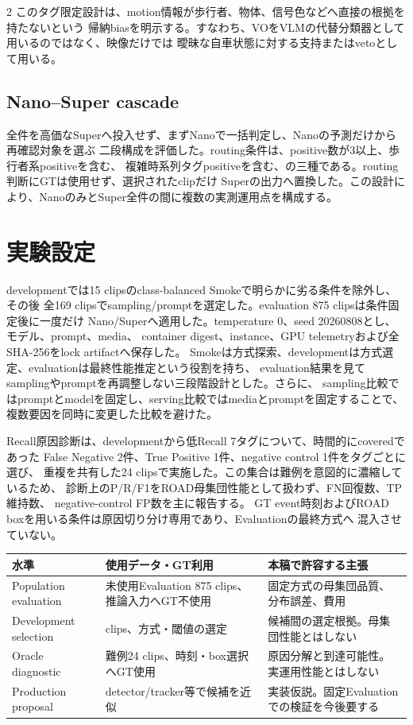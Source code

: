 \documentclass[9pt,a4paper]{extarticle}
\begin{document}
\begin{multicols}{2}
このタグ限定設計は、motion情報が歩行者、物体、信号色などへ直接の根拠を持たないという
帰納biasを明示する。すなわち、VOをVLMの代替分類器として用いるのではなく、映像だけでは
曖昧な自車状態に対する支持またはvetoとして用いる。

\subsection{Nano--Super cascade}
全件を高価なSuperへ投入せず、まずNanoで一括判定し、Nanoの予測だけから再確認対象を選ぶ
二段構成を評価した。routing条件は、positive数が3以上、歩行者系positiveを含む、
複雑時系列タグpositiveを含む、の三種である。routing判断にGTは使用せず、選択されたclipだけ
Superの出力へ置換した。この設計により、NanoのみとSuper全件の間に複数の実測運用点を構成する。

\section{実験設定}
developmentでは15 clipsのclass-balanced Smokeで明らかに劣る条件を除外し、その後
全169 clipsでsampling/promptを選定した。evaluation 875 clipsは条件固定後に一度だけ
Nano/Superへ適用した。temperature 0、seed 20260808とし、モデル、prompt、media、
container digest、instance、GPU telemetryおよび全SHA-256をlock artifactへ保存した。
Smokeは方式探索、developmentは方式選定、evaluationは最終性能推定という役割を持ち、
evaluation結果を見てsamplingやpromptを再調整しない三段階設計とした。さらに、
sampling比較ではpromptとmodelを固定し、serving比較ではmediaとpromptを固定することで、
複数要因を同時に変更した比較を避けた。

Recall原因診断は、developmentから低Recall 7タグについて、時間的にcoveredであった
False Negative 2件、True Positive 1件、negative control 1件をタグごとに選び、
重複を共有した24 clipsで実施した。この集合は難例を意図的に濃縮しているため、
診断上のP/R/F1をROAD母集団性能として扱わず、FN回復数、TP維持数、
negative-control FP数を主に報告する。
GT event時刻およびROAD boxを用いる条件は原因切り分け専用であり、Evaluationの最終方式へ
混入させていない。

\begin{center}
\label{tab:claim-levels}
\scriptsize
\begin{tabularx}{\columnwidth}{l>{\raggedright\arraybackslash}X>{\raggedright\arraybackslash}X}
\toprule
水準 & 使用データ・GT利用 & 本稿で許容する主張\\
\midrule
Population evaluation & 未使用Evaluation 875 clips、推論入力へGT不使用 &
固定方式の母集団品質、分布誤差、費用\\
Development selection & 169 clips、方式・閾値の選定 &
候補間の選定根拠。母集団性能とはしない\\
Oracle diagnostic & 難例24 clips、時刻・box選択へGT使用 &
原因分解と到達可能性。実運用性能とはしない\\
Production proposal & detector/tracker等で候補を近似 &
実装仮説。固定Evaluationでの検証を今後要する\\
\bottomrule
\end{tabularx}
\end{center}


\end{multicols}
\end{document}
